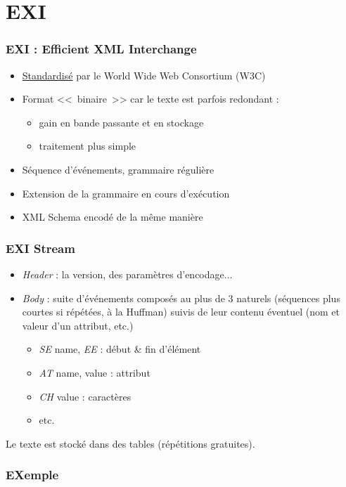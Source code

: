 \documentclass[compress]{beamer}
\begin{document}
\section{EXI}
\begin{frame}
	\frametitle{EXI : Efficient XML Interchange}
	\begin{itemize}
	\item \href{https://www.w3.org/TR/exi/}{Standardisé}
		par le World Wide Web Consortium (W3C) \pause
	\item Format <<~binaire~>> car le texte est parfois redondant : \pause
		\begin{itemize}
		\item gain en bande passante et en stockage \pause
		\item traitement plus simple \pause
		\end{itemize}
	\item Séquence d'événements, grammaire régulière \pause
	\item Extension de la grammaire en cours d'exécution \pause
	\item XML Schema encodé de la même manière
	\end{itemize}
\end{frame}
\begin{frame}
	\frametitle{EXI Stream}
	\begin{itemize}
	\item \emph{Header} : la version, des paramètres d'encodage... \pause
	\item \emph{Body} : suite d'événements composés au plus de 3 naturels
		(séquences plus courtes si répétées, à la Huffman) suivis
		de leur contenu éventuel (nom et valeur d'un attribut, etc.) \pause
		\begin{itemize}
		\item \emph{SE} name, \emph{EE} : début \& fin d'élément \pause
		\item \emph{AT} name, value : attribut \pause
		\item \emph{CH} value : caractères \pause
		\item etc. \pause
		\end{itemize}
	\end{itemize}

	Le texte est stocké dans des tables (répétitions gratuites).
\end{frame}
\begin{frame}
	\frametitle{EXemple}
\end{frame}
\end{document}
